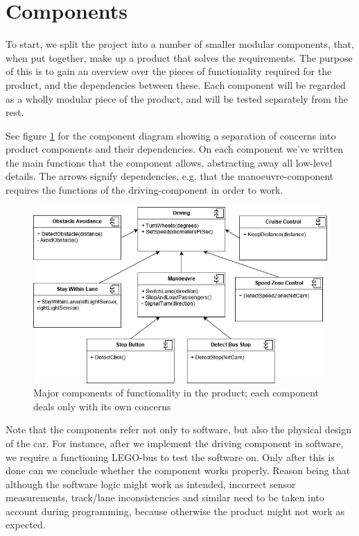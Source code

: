 \section{Components}

To start, we split the project into a number of smaller modular components, that, when put together, make up a product that solves the requirements. The purpose of this is to gain an overview over the pieces of functionality required for the product, and the dependencies between these. Each component will be regarded as a wholly modular piece of the product, and will be tested separately from the rest. 


See figure \ref{fig:components} for the component diagram showing a separation of concerns into product components and their dependencies. On each component we've written the main functions that the component allows, abstracting away all low-level details. The arrows signify dependencies, e.g. that the manoeuvre-component requires the functions of the driving-component in order to work. 

\begin{figure}[ht]
    \includegraphics[width=\textwidth]{Images/Design/componentDiagram.png}
    \caption{Major components of functionality in the product; each component deals only with its own concerns}
    \label{fig:components}
\end{figure}

Note that the components refer not only to software, but also the physical design of the car. For instance, after we implement the driving component in software, we require a functioning LEGO-bus to test the software on. Only after this is done can we conclude whether the component works properly. Reason being that although the software logic might work as intended, incorrect sensor measurements, track/lane inconsistencies and similar need to be taken into account during programming, because otherwise the product might not work as expected.
